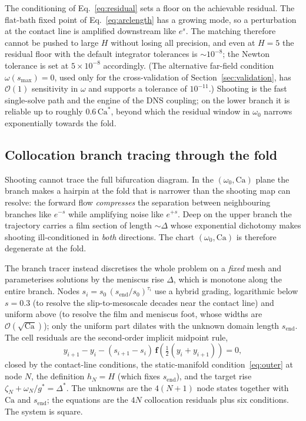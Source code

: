 \documentclass[11pt,a4paper]{article}
\newcommand{\Ca}{\mathrm{Ca}}
\begin{document}
The conditioning of Eq.~\eqref{eq:residual} sets a floor on the achievable
residual. The flat-bath fixed point of Eq.~\eqref{eq:arclength} has a growing
mode, so a perturbation at the contact line is amplified downstream like
$e^{s}$. The matching therefore cannot be pushed to large $H$ without losing
all precision, and even at $H = 5$ the residual floor with the default
integrator tolerances is $\sim 10^{-8}$; the Newton tolerance is set at
$5\times10^{-8}$ accordingly. (The alternative far-field condition
$\omega(s_{\max}) = 0$, used only for the cross-validation of
Section~\ref{sec:validation}, has $\mathcal{O}(1)$ sensitivity in $\omega$ and
supports a tolerance of $10^{-11}$.) Shooting is the fast single-solve path and
the engine of the DNS coupling; on the lower branch it is reliable up to
roughly $0.6\,\Ca^{*}$, beyond which the residual window in $\omega_0$ narrows
exponentially towards the fold.

\subsection{Collocation branch tracing through the fold}

Shooting cannot trace the full bifurcation diagram. In the $(\omega_0, \Ca)$
plane the branch makes a hairpin at the fold that is narrower than the shooting
map can resolve: the forward flow \emph{compresses} the separation between
neighbouring branches like $e^{-s}$ while amplifying noise like $e^{+s}$. Deep
on the upper branch the trajectory carries a film section of length
$\sim \Delta$ whose exponential dichotomy makes shooting ill-conditioned in
\emph{both} directions. The chart $(\omega_0, \Ca)$ is therefore degenerate at
the fold.

The branch tracer instead discretises the whole problem on a \emph{fixed} mesh
and parameterises solutions by the meniscus rise $\Delta$, which is monotone
along the entire branch. Nodes $s_i = s_0\,(s_{\mathrm{end}}/s_0)^{\tau_i}$ use
a hybrid grading, logarithmic below $s = 0.3$ (to resolve the slip-to-mesoscale
decades near the contact line) and uniform above (to resolve the film and
meniscus foot, whose widths are $\mathcal{O}(\sqrt{\Ca})$); only the uniform
part dilates with the unknown domain length $s_{\mathrm{end}}$. The cell
residuals are the second-order implicit midpoint rule,
\begin{equation}
  y_{i+1} - y_i - (s_{i+1}-s_i)\,
    \mathbf{f}\!\left(\tfrac12(y_i + y_{i+1})\right) = 0,
\end{equation}
closed by the contact-line conditions, the static-manifold
condition~\eqref{eq:outer} at node $N$, the definition $h_N = H$ (which fixes
$s_{\mathrm{end}}$), and the target rise
$\zeta_N + \omega_N/g^{*} = \Delta^{*}$. The unknowns are the $4(N{+}1)$ node
states together with $\Ca$ and $s_{\mathrm{end}}$; the equations are the $4N$
collocation residuals plus six conditions. The system is square.
\end{document}
